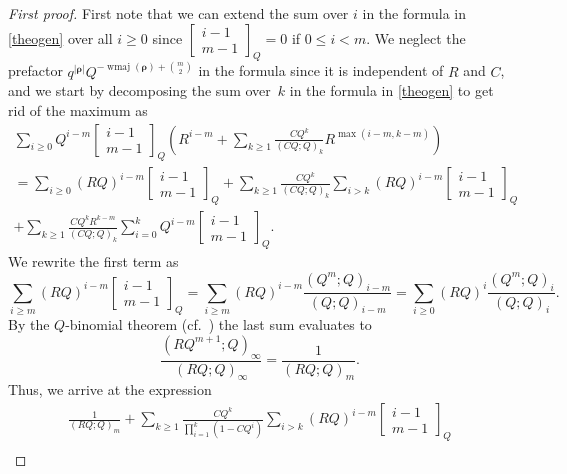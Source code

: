 \documentclass[12pt,reqno]{amsart}
\numberwithin{equation}{section}
\theoremstyle{definition}
\DeclareMathOperator{\wmaj}{wmaj}
\newcommand{\rem}{{\boldsymbol\rho}}
\begin{document}
\begin{proof}[First proof]
First note that we can extend the sum over $i$ in the formula in
\cref{theogen} over all $i \ge 0$ since $\left[ \begin{smallmatrix}i-1
\\ m-1\end{smallmatrix} \right]_Q=0$ if $0 \le i < m$. We neglect the
prefactor $q^{|\rem|} Q^{-\wmaj(\rem)+\binom{m}{2}}$ in the formula
since it is independent of $R$ 
and $C$, and we start by decomposing the sum over~$k$ in the formula in \cref{theogen} to get rid of the maximum as
\begin{multline}\label{EquationMultipleLines}
     \sum_{i \ge 0} Q^{i-m}
 \begin{bmatrix} i-1 \\ m-1 \end{bmatrix}_Q
\left( R^{i-m} + \sum_{k \ge 1}  \frac{C Q^{k}}{(C Q; Q)_k}
R^{\max(i-m,k-m)} \right)\\
=
\sum_{i \ge 0} (RQ)^{i-m}
 \begin{bmatrix} i-1 \\ m-1 \end{bmatrix}_Q
 + \sum_{k \ge 1}  \frac{C Q^{k}}{(C Q; Q)_k}
\sum_{i > k} (RQ)^{i-m}
 \begin{bmatrix} i-1 \\ m-1 \end{bmatrix}_Q \\
 + \sum_{k \ge 1}  \frac{C Q^{k}R^{k-m}}{(C Q; Q)_k}\sum_{i =0}^k Q^{i-m}
 \begin{bmatrix} i-1 \\ m-1 \end{bmatrix}_Q.
\end{multline}
We rewrite the first term as
$$
 \sum_{i \ge m} (RQ)^{i-m}
 \begin{bmatrix} i-1 \\ m-1 \end{bmatrix}_Q= \sum_{i \ge m} (RQ)^{i-m} \frac{(Q^{m};Q)_{i-m}}{(Q;Q)_{i-m}}
 =\sum_{i\geq 0}(RQ)^i\frac{(Q^  {m};Q)_{i}}{(Q;Q)_{i}}.
 $$
By the $Q$-binomial theorem (cf.\
\cite[Eq.~(1.3.2); Appendix (II.3)]{MR2128719}) the last sum evaluates
to
$$
\frac {(RQ^{m+1};Q)_\infty} {(RQ;Q)_\infty}
=\frac {1} {(RQ;Q)_m}.
$$ 
Thus, we arrive at the expression
\begin{multline}\label{GFSplitIntoPartsWithoutMax}
 \frac{1}{(RQ;Q)_m}
 + \sum_{k \ge 1}  \frac{C Q^{k}}{\prod_{i=1}^{k}(1-C Q^{i})}
\sum_{i > k} (RQ)^{i-m}
 \begin{bmatrix} i-1 \\ m-1 \end{bmatrix}_Q \\

\end{multline}
\end{proof}
\end{document}
